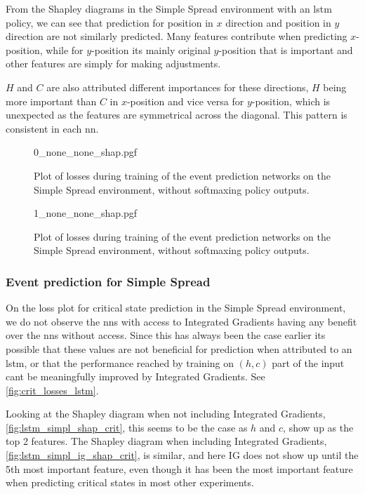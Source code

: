 \documentclass[UKenglish]{uiomasterthesis}
\begin{document}
From the Shapley diagrams in the Simple Spread environment with an \ac{lstm} policy, we can see that prediction for position in $x$ direction and position in $y$ direction are not similarly predicted. Many features contribute when predicting $x$-position, while for $y$-position its mainly original $y$-position that is important and other features are simply for making adjustments.

$H$ and $C$ are also attributed different importances for these directions, $H$ being more important than $C$ in $x$-position and vice versa for $y$-position, which is unexpected as the features are symmetrical across the diagonal. This pattern is consistent in each \ac{nn}.

\begin{figure}[hbtp]
    \centering
    {0_none_none_shap.pgf}
    \caption{Plot of losses during training of the event prediction networks on the Simple Spread environment, without softmaxing policy outputs.}
    \label{fig:lstm_simpl_shap_x}
\end{figure}

\begin{figure}[hbtp]
    \centering
    {1_none_none_shap.pgf}
    \caption{Plot of losses during training of the event prediction networks on the Simple Spread environment, without softmaxing policy outputs.}
    \label{fig:lstm_simpl_shap_y}
\end{figure}

\subsubsection{Event prediction for Simple Spread}

On the loss plot for critical state prediction in the Simple Spread environment, we do not observe the \acp{nn} with access to Integrated Gradients having any benefit over the \acp{nn} without access. Since this has always been the case earlier its possible that these values are not beneficial for prediction when attributed to an \ac{lstm}, or that the performance reached by training on $(h,c)$ part of the input cant be meaningfully improved by Integrated Gradients. See \cref{fig:crit_losses_lstm}.

Looking at the Shapley diagram when not including Integrated Gradients, \cref{fig:lstm_simpl_shap_crit}, this seems to be the case as $h$ and $c$, show up as the top 2 features. The Shapley diagram when including Integrated Gradients, \cref{fig:lstm_simpl_ig_shap_crit}, is similar, and here IG does not show up until the 5th most important feature, even though it has been the most important feature when predicting critical states in most other experiments.
\end{document}
